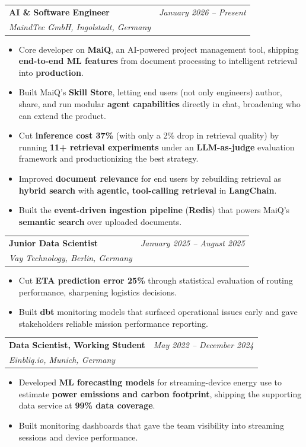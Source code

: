 \documentclass[a4paper,11pt]{article}
\makeatletter
\newcommand{\resumeSubheading}[4]{
  \vspace{4pt}
  \begin{tabular*}{\textwidth}{l@{\extracolsep{\fill}}r}
    \textbf{#1} & \textit{\small #4} \\
    \textit{\small #3} & \small #2 \\
  \end{tabular*}\vspace{-4pt}
}
\makeatother
\begin{document}
\resumeSubheading
{AI \& Software Engineer}{}{MaindTec GmbH, Ingolstadt, Germany}{January 2026 -- Present}
\begin{itemize}[leftmargin=3ex, rightmargin=2ex, noitemsep, labelsep=1.2mm, itemsep=0.7mm]\small
  \item Core developer on \textbf{MaiQ}, an AI-powered project management tool, shipping \textbf{end-to-end ML features} from document processing to intelligent retrieval into \textbf{production}.
  \item Built MaiQ's \textbf{Skill Store}, letting end users (not only engineers) author, share, and run modular \textbf{agent capabilities} directly in chat, broadening who can extend the product.
  \item Cut \textbf{inference cost 37\%} (with only a 2\% drop in retrieval quality) by running \textbf{11+ retrieval experiments} under an \textbf{LLM-as-judge} evaluation framework and productionizing the best strategy.
  \item Improved \textbf{document relevance} for end users by rebuilding retrieval as \textbf{hybrid search} with \textbf{agentic, tool-calling retrieval} in \textbf{LangChain}.
  \item Built the \textbf{event-driven ingestion pipeline} (\textbf{Redis}) that powers MaiQ's \textbf{semantic search} over uploaded documents.
\end{itemize}

\vspace{1mm}

\resumeSubheading
{Junior Data Scientist}{}{Vay Technology, Berlin, Germany}{January 2025 -- August 2025}
\begin{itemize}[leftmargin=3ex, rightmargin=2ex, noitemsep, labelsep=1.2mm, itemsep=0.7mm]\small
  \item Cut \textbf{ETA prediction error 25\%} through statistical evaluation of routing performance, sharpening logistics decisions.
  \item Built \textbf{dbt} monitoring models that surfaced operational issues early and gave stakeholders reliable mission performance reporting.
\end{itemize}

\vspace{1mm}

\resumeSubheading
{Data Scientist, Working Student}{}{Einbliq.io, Munich, Germany}{May 2022 -- December 2024}
\begin{itemize}[leftmargin=3ex, rightmargin=2ex, noitemsep, labelsep=1.2mm, itemsep=0.7mm]\small
  \item Developed \textbf{ML forecasting models} for streaming-device energy use to estimate \textbf{power emissions and carbon footprint}, shipping the supporting data service at \textbf{99\% data coverage}.
  \item Built monitoring dashboards that gave the team visibility into streaming sessions and device performance.
\end{itemize}
\end{document}
